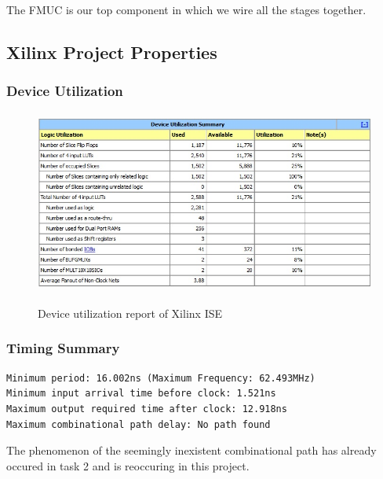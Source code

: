 The FMUC is our top component in which we wire all the stages together. 

\subsection{Xilinx Project Properties}

\subsubsection{Device Utilization}

\begin{figure}[!htb]
	\scalebox{1.00} %
	{\includegraphics[height=6cm]{images/util.jpg}} %
	\caption{Device utilization report of Xilinx ISE} 
	\label{fig:util} %
\end{figure} 

\subsubsection{Timing Summary}

\begin{lstlisting}
Minimum period: 16.002ns (Maximum Frequency: 62.493MHz)
Minimum input arrival time before clock: 1.521ns
Maximum output required time after clock: 12.918ns
Maximum combinational path delay: No path found
\end{lstlisting}

The phenomenon of the seemingly inexistent combinational path has already occured in task 2 and
is reoccuring in this project.

\newpage

